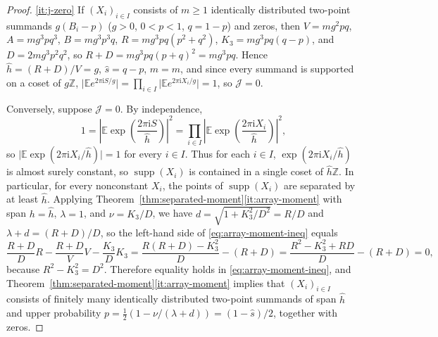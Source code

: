 \documentclass[11pt]{article}
\numberwithin{equation}{section}
\theoremstyle{definition}
\theoremstyle{remark}
\DeclareMathOperator{\supp}{supp}
\newcommand{\E}{\mathbb E}
\newcommand{\Z}{\mathbb Z}
\newcommand{\ii}{\mathrm i}
\begin{document}
\begin{proof}
\ref{it:j-zero} If $(X_i)_{i\in I}$ consists of $m\ge1$ identically
distributed two-point summands $g(B_i-p)$ ($g>0$, $0<p<1$, $q=1-p$) and zeros,
then $V=mg^2pq$, $A=mg^3pq^3$, $B=mg^3p^3q$, $R=mg^3pq(p^2+q^2)$,
$K_3=mg^3pq(q-p)$, and $D=2mg^3p^2q^2$, so $R+D=mg^3pq(p+q)^2=mg^3pq$. Hence
$\widehat h=(R+D)/V=g$, $\widehat s=q-p$, $\widehat m=m$, and since every
summand is supported on a coset of $g\Z$,
$\bigl|\E e^{2\pi\ii S/g}\bigr|=\prod_{i\in I}\bigl|\E e^{2\pi\ii X_i/g}\bigr|=1$,
so $\mathcal J=0$.

Conversely, suppose $\mathcal J=0$. By independence,
\[
 1=\left|\E\exp\!\left(\frac{2\pi\ii S}{\widehat h}\right)\right|^2
 =\prod_{i\in I}\left|\E\exp\!\left(\frac{2\pi\ii X_i}{\widehat h}\right)\right|^2,
\]
so $\bigl|\E\exp(2\pi\ii X_i/\widehat h)\bigr|=1$ for every $i\in I$. Thus
for each $i\in I$, $\exp(2\pi\ii X_i/\widehat h)$ is almost surely constant,
so $\supp(X_i)$ is contained in a single coset of $\widehat h\Z$. In
particular, for every nonconstant $X_i$, the points of $\supp(X_i)$ are
separated by at least $\widehat h$. Applying
Theorem~\ref{thm:separated-moment}\ref{it:array-moment} with span
$h=\widehat h$, $\lambda=1$, and $\nu=K_3/D$, we have
$d=\sqrt{1+K_3^2/D^2}=R/D$ and $\lambda+d=(R+D)/D$, so the left-hand side of
\eqref{eq:array-moment-ineq} equals
\[
 \frac{R+D}{D}R-\frac{R+D}{V}V-\frac{K_3}{D}K_3
 =\frac{R(R+D)-K_3^2}{D}-(R+D)
 =\frac{R^2-K_3^2+RD}{D}-(R+D)=0,
\]
because $R^2-K_3^2=D^2$. Therefore equality holds in
\eqref{eq:array-moment-ineq}, and Theorem~\ref{thm:separated-moment}\ref{it:array-moment}
implies that $(X_i)_{i\in I}$ consists of finitely many identically
distributed two-point summands of span $\widehat h$ and upper probability
$p=\frac12(1-\nu/(\lambda+d))=(1-\widehat s)/2$, together with zeros.


\end{proof}
\end{document}
